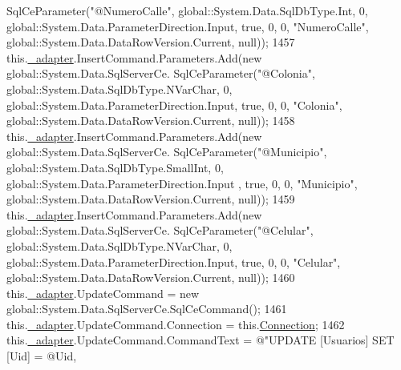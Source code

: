 \begin{DoxyCode}
      SqlCeParameter(\textcolor{stringliteral}{"@NumeroCalle"}, global::System.Data.SqlDbType.Int, 0, global::System.Data.ParameterDirection.Input, \textcolor{keyword}{
      true}, 0, 0, \textcolor{stringliteral}{"NumeroCalle"}, global::System.Data.DataRowVersion.Current, null));
1457             this.\hyperlink{class_proyecto___integrador__3_1_1ds_usuarios_table_adapters_1_1_usuarios_table_adapter_ab48b9b83ce2db01dbbc83ad45b428a80}{\_adapter}.InsertCommand.Parameters.Add(\textcolor{keyword}{new} global::System.Data.SqlServerCe.
      SqlCeParameter(\textcolor{stringliteral}{"@Colonia"}, global::System.Data.SqlDbType.NVarChar, 0, global::System.Data.ParameterDirection.Input, \textcolor{keyword}{
      true}, 0, 0, \textcolor{stringliteral}{"Colonia"}, global::System.Data.DataRowVersion.Current, null));
1458             this.\hyperlink{class_proyecto___integrador__3_1_1ds_usuarios_table_adapters_1_1_usuarios_table_adapter_ab48b9b83ce2db01dbbc83ad45b428a80}{\_adapter}.InsertCommand.Parameters.Add(\textcolor{keyword}{new} global::System.Data.SqlServerCe.
      SqlCeParameter(\textcolor{stringliteral}{"@Municipio"}, global::System.Data.SqlDbType.SmallInt, 0, global::System.Data.ParameterDirection.Input
      , \textcolor{keyword}{true}, 0, 0, \textcolor{stringliteral}{"Municipio"}, global::System.Data.DataRowVersion.Current, null));
1459             this.\hyperlink{class_proyecto___integrador__3_1_1ds_usuarios_table_adapters_1_1_usuarios_table_adapter_ab48b9b83ce2db01dbbc83ad45b428a80}{\_adapter}.InsertCommand.Parameters.Add(\textcolor{keyword}{new} global::System.Data.SqlServerCe.
      SqlCeParameter(\textcolor{stringliteral}{"@Celular"}, global::System.Data.SqlDbType.NVarChar, 0, global::System.Data.ParameterDirection.Input, \textcolor{keyword}{
      true}, 0, 0, \textcolor{stringliteral}{"Celular"}, global::System.Data.DataRowVersion.Current, null));
1460             this.\hyperlink{class_proyecto___integrador__3_1_1ds_usuarios_table_adapters_1_1_usuarios_table_adapter_ab48b9b83ce2db01dbbc83ad45b428a80}{\_adapter}.UpdateCommand = \textcolor{keyword}{new} global::System.Data.SqlServerCe.SqlCeCommand();
1461             this.\hyperlink{class_proyecto___integrador__3_1_1ds_usuarios_table_adapters_1_1_usuarios_table_adapter_ab48b9b83ce2db01dbbc83ad45b428a80}{\_adapter}.UpdateCommand.Connection = this.\hyperlink{class_proyecto___integrador__3_1_1ds_usuarios_table_adapters_1_1_usuarios_table_adapter_a84b2a5b2b50b633d359dc7a29ce2e439}{Connection};
1462             this.\hyperlink{class_proyecto___integrador__3_1_1ds_usuarios_table_adapters_1_1_usuarios_table_adapter_ab48b9b83ce2db01dbbc83ad45b428a80}{\_adapter}.UpdateCommand.CommandText = \textcolor{stringliteral}{@"UPDATE [Usuarios] SET [Uid] = @Uid,
}
\end{DoxyCode}
